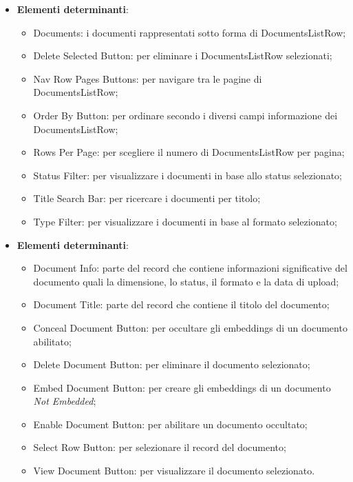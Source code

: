 \documentclass[10pt, a4paper]{article}
\begin{document}
\label{DocumentsListDettaglio}
\begin{itemize}
    \item \textbf{Elementi determinanti}:
     \begin{itemize}
        \item Documents: i documenti rappresentati sotto forma di DocumentsListRow;
        \item Delete Selected Button: per eliminare i DocumentsListRow selezionati;
        \item Nav Row Pages Buttons: per navigare tra le pagine di DocumentsListRow;
        \item Order By Button: per ordinare secondo i diversi campi informazione dei DocumentsListRow;
        \item Rows Per Page: per scegliere il numero di DocumentsListRow per pagina;
        \item Status Filter: per visualizzare i documenti in base allo status selezionato;
        \item Title Search Bar: per ricercare i documenti per titolo;
        \item Type Filter: per visualizzare i documenti in base al formato selezionato; 
    \end{itemize}
\end{itemize}


\label{DocumentsListRowDettaglio}
\begin{itemize}
    \item \textbf{Elementi determinanti}:
     \begin{itemize}
        \item Document Info: parte del record che contiene informazioni significative del documento quali la dimensione, lo status, il formato e la data di upload;
        \item Document Title: parte del record che contiene il titolo del documento;
        \item Conceal Document Button: per occultare gli embeddings di un documento abilitato;
        \item Delete Document Button: per eliminare il documento selezionato;
        \item Embed Document Button: per creare gli embeddings di un documento \textit{Not Embedded};
        \item Enable Document Button: per abilitare un documento occultato;
        \item Select Row Button: per selezionare il record del documento;
        \item View Document Button: per visualizzare il documento selezionato.
    \end{itemize}
\end{itemize}
\end{document}

